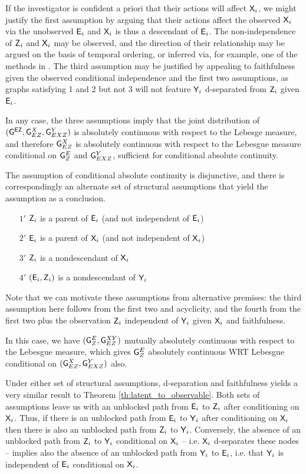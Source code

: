 If the investigator is confident a priori that their actions will affect $\mathsf{X}_i$, we might justify the first assumption by arguing that their actions affect the observed $\mathsf{X}_i$ via the unobserved $\mathsf{E}_i$ and $\mathsf{X}_i$ is thus a descendant of $\mathsf{E}_i$. The non-independence of $\mathsf{Z}_i$ and $\mathsf{X}_i$ may be observed, and the direction of their relationship may be argued on the basis of temporal ordering, or inferred via, for example, one of the methods in \citep{peters_elements_2017}. The third assumption may be justified by appealing to faithfulness given the observed conditional independence and the first two assumptions, as graphs satisfying 1 and 2 but not 3 will not feature $\mathsf{Y}_i$ d-separated from $\mathsf{Z}_i$ given $\mathsf{E}_i$.    

In any case, the three assumptions imply that the joint distribution of $(\mathsf{G}^{\mathsf{EZ}}, \mathsf{G}^{X}_{EZ}, \mathsf{G}^Y_{EXZ})$ is absolutely continuous with respect to the Lebesge measure, and therefore $\mathsf{G}^X_{EZ}$ is absolutely continuous with respect to the Lebesgue measure conditional on $\mathsf{G}^E_Z$ and $\mathsf{G}^Y_{EXZ}$, sufficient for conditional absolute continuity.

The assumption of conditional absolute continuity is disjunctive, and there is correspondingly an alternate set of structural assumptions that yield the assumption as a conclusion.

\begin{itemize}
    \item[$1'$] $\mathsf{Z}_i$ is a parent of $\mathsf{E}_i$ (and not independent of $\mathsf{E}_i$)
    \item[$2'$] $\mathsf{E}_i$ is a parent of $\mathsf{X}_i$ (and not independent of $\mathsf{X}_i$)
    \item[$3'$] $\mathsf{Z}_i$ is a nondescendant of $\mathsf{X}_i$
    \item[$4'$] $(\mathsf{E}_i, \mathsf{Z}_i)$ is a nondescendant of $\mathsf{Y}_i$
\end{itemize}

Note that we can motivate these assumptions from alternative premises: the third assumption here follows from the first two and acyclicity, and the fourth from the first two plus the observation $\mathsf{Z}_i$ independent of $\mathsf{Y}_i$ given $\mathsf{X}_i$ and faithfulness. 

In this case, we have $(\mathsf{G}^E_Z, \mathsf{G}^{XY}_{EZ})$ mutually absolutely continuous with respect to the Lebesgue measure, which gives $\mathsf{G}^E_Z$ absolutely continuous WRT Lebesgue conditional on $(\mathsf{G}^X_{EZ}, \mathsf{G}^Y_{EXZ})$ also.

Under either set of structural assumptions, d-separation and faithfulness yields a very similar result to Theorem \ref{th:latent_to_observable}. Both sets of assumptions leave us with an unblocked path from $\mathsf{E}_i$ to $\mathsf{Z}_i$ after conditioning on $\mathsf{X}_i$. Thus, if there is an unblocked path from $\mathsf{E}_i$ to $\mathsf{Y}_i$ after conditioning on $\mathsf{X}_i$ then there is also an unblocked path from $\mathsf{Z}_i$ to $\mathsf{Y}_i$. Conversely, the absence of an unblocked path from $\mathsf{Z}_i$ to $\mathsf{Y}_i$ conditional on $\mathsf{X}_i$ -- i.e. $\mathsf{X}_i$ d-separates these nodes -- implies also the absence of an unblocked path from $\mathsf{Y}_i$ to $\mathsf{E}_i$, i.e. that $\mathsf{Y}_i$ is independent of $\mathsf{E}_i$ conditional on $\mathsf{X}_i$.